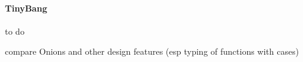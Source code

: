 

\paragraph{TinyBang}


to do

compare Onions and other design features (esp typing of functions with cases)
